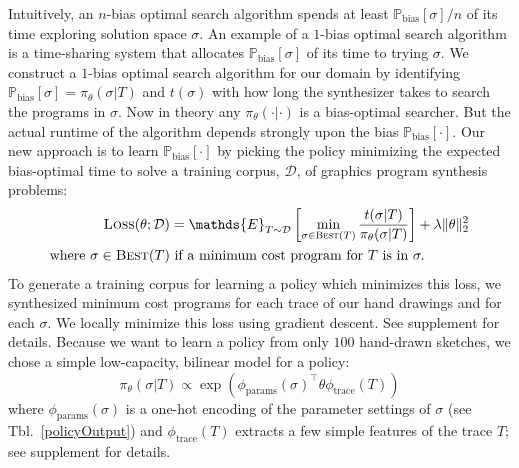 \documentclass{article}
\newcommand{\expect}{\mathds{E}} %
\newcommand{\probability}{\mathds{P}} %
\theoremstyle{definition}
\begin{document}
Intuitively, an $n$-bias optimal search algorithm
spends at least $\probability_{\text{bias}}[\sigma ]/n$ of its time
exploring solution space $\sigma $.
An example of a $1$-bias optimal search algorithm is a time-sharing system
that allocates $\probability_{\text{bias}}[\sigma ]$ of its time to trying $\sigma $.
We construct a $1$-bias optimal search algorithm for our domain by
identifying $\probability_{\text{bias}}[\sigma ] = \pi_\theta(\sigma |T)$
and $t(\sigma )  $ with how long the synthesizer takes to search  the programs in $\sigma $.
Now in theory any $\pi_\theta(\cdot |\cdot ) $ is a bias-optimal searcher.
But the actual runtime of the algorithm depends strongly upon
the bias $\probability_{\text{bias}}[\cdot ]$.
Our new approach is to learn $\probability_{\text{bias}}[\cdot ]$
by picking the policy minimizing the
expected bias-optimal time to solve a training corpus, $\mathcal{D}$, of graphics program synthesis problems:
\begin{align}
\textsc{Loss}(\theta ; \mathcal{D})& =  \expect_{T\sim\mathcal{D}}\left[ \min_{\sigma\in \text{\textsc{Best}}(T)}\frac{t(\sigma | T)}{\pi_\theta (\sigma | T)}\right] + \lambda \Vert\theta\Vert_2^2\label{policyLoss}\\
\text{where }  \sigma \in\text{\textsc{Best}}(T) &\text{ if  a minimum cost program for }T \text{ is in }\sigma .\nonumber %
\end{align}
To generate a training corpus for learning a policy which minimizes this loss,
we synthesized minimum cost programs for each trace of our hand drawings
and for each $\sigma $.
We locally minimize this loss using gradient descent. %
See supplement for details.
Because we want to learn a policy from only $100$ hand-drawn sketches,
we chose a simple low-capacity, bilinear model for a policy:
\begin{equation}
  \pi_{\theta}(\sigma |T)\propto \exp \left( \phi_{\text{params}}(\sigma )^\top\theta \phi_{\text{trace}}(T)\right)
\end{equation}
where $\phi_{\text{params}}(\sigma  )$ is a one-hot encoding of
the parameter settings of $\sigma $ (see Tbl.~\ref{policyOutput})
and $\phi_{\text{trace}}(T)$ extracts a few simple features of the trace $T$;
see supplement for details.
\end{document}
